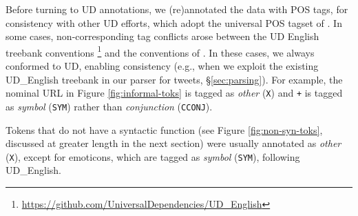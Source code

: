 \documentclass[11pt,a4paper]{article}
\newcommand{\heart}{\ensuremath\heartsuit}
\newcommand{\yjcomment}[1]{\textcolor{orange}{[$_\mathrm{L}^\mathrm{Y}$#1]}}
\newcommand{\yicomment}[1]{\textcolor{gray}{[#1 ---\textsc{yi}]}}
\begin{document}
Before turning to UD annotations, we (re)annotated the data with 
POS tags, for consistency with other UD efforts,
which adopt the universal POS tagset of .
In some cases,  non-corresponding tag conflicts arose between the UD English 
treebank conventions \cite[UD\_English;][]{Marneffe2014UniversalSD}\footnote{\url{https://github.com/UniversalDependencies/UD_English}}
and the conventions of .  %
In these cases, we always
conformed to UD, enabling consistency (e.g., when we exploit the
existing UD\_English treebank in our parser for tweets, \S\ref{sec:parsing}).  For example,  
the nominal URL in Figure \ref{fig:informal-toks} is tagged as {\it
  other} ({\tt X}) and {\tt +} is tagged as {\it symbol} ({\tt SYM})
rather than {\it conjunction} ({\tt CCONJ}).  

Tokens that do not have a syntactic function (see Figure \ref{fig:non-syn-toks}, discussed at greater
length in the next section) were usually annotated as \emph{other}
(\texttt{X}), except for emoticons, which are tagged as \emph{symbol}
(\texttt{SYM}), following UD\_English.

\end{document}
